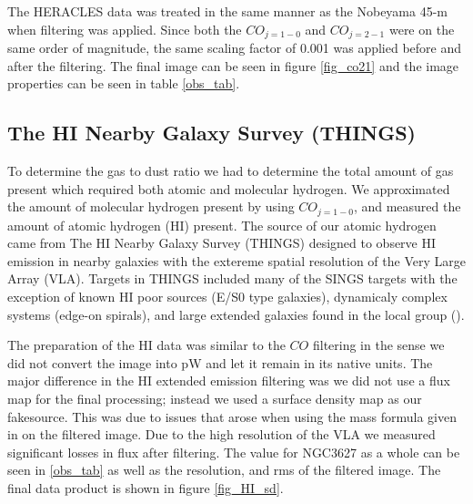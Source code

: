 The HERACLES data was treated in the same manner as the Nobeyama 45-m when filtering was applied.  Since both the $CO_{j=1-0}$ and $CO_{j=2-1}$ were on the same order of magnitude, the same scaling factor of 0.001 was applied before and after the filtering.  The final image can be seen in figure \ref{fig_co21} and the image properties can be seen in table \ref{obs_tab}.


\subsection{The HI Nearby Galaxy Survey (THINGS)}

To determine the gas to dust ratio we had to determine the total amount of gas present which required both atomic and molecular hydrogen.  We approximated the amount of molecular hydrogen present by using $CO_{j=1-0}$, and measured the amount of atomic hydrogen (HI) present.  The source of our atomic hydrogen came from The HI Nearby Galaxy Survey (THINGS) designed to observe HI emission in nearby galaxies with the extereme spatial resolution of the Very Large Array (VLA).  Targets in THINGS included many of the SINGS targets with the exception of known HI poor sources (E/S0 type galaxies), dynamicaly complex systems (edge-on spirals), and large extended galaxies found in the local group (\protect\citet{walter2008}).

The preparation of the HI data was similar to the $CO$ filtering in the sense we did not convert the image into pW and let it remain in its native units.  The major difference in the HI extended emission filtering was we did not use a flux map for the final processing; instead we used a surface density map as our fakesource.  This was due to issues that arose when using the mass formula given in \protect\citet{walter2008} on the filtered image.  Due to the high resolution of the VLA we measured significant losses in flux after filtering.  The value for NGC3627 as a whole can be seen in \ref{obs_tab} as well as the resolution, and rms of the filtered image.  The final data product is shown in figure \ref{fig_HI_sd}.

